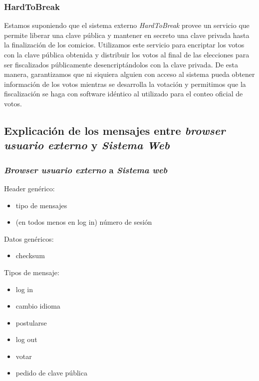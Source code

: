 \subsubsection{HardToBreak}

Estamos suponiendo que el sistema externo \emph{HardToBreak} provee un servicio que permite liberar una clave pública y mantener en secreto una clave privada hasta la finalización de los comicios.
Utilizamos este servicio para encriptar los votos con la clave pública obtenida y distribuir los votos al final de las elecciones para ser fiscalizados públicamente desencriptándolos con la clave privada. De esta manera, garantizamos que ni siquiera alguien con acceso al sistema pueda obtener información de los votos mientras se desarrolla la votación y permitimos que la fiscalización se haga con software idéntico al utilizado para el conteo oficial de votos.


\subsection{Explicación de los mensajes entre \emph{browser usuario externo} y \emph{Sistema Web}}
\label{mensajes}
\subsubsection{\emph{Browser usuario externo} a \emph{Sistema web}}
Header genérico:
\begin{itemize}
 \item tipo de mensajes
 \item (en todos menos en log in) número de sesión
\end{itemize}

Datos genéricos:
\begin{itemize}
 \item checksum
\end{itemize}

Tipos de mensaje:
\begin{itemize}
 \item log in 
 \item cambio idioma
 \item postularse
 \item log out
 \item votar
 \item pedido de clave pública
\end{itemize}

